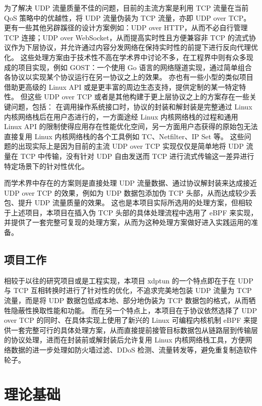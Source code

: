 为了解决 UDP 流量质量不佳的问题，目前的主流方案是利用 TCP 流量在当前 QoS 策略中的优越性，将 UDP 流量伪装为 TCP 流量，亦即 UDP over TCP。
更有一些其他另辟蹊径的设计方案例如：UDP over HTTP，从而不必自行管理 TCP 连接；UDP over WebSocket，从而提高实时性且方便兼容非 TCP 的流式协议作为下层协议，并允许通过内容分发网络在保持实时性的前提下进行反向代理优化。
这些处理方案由于技术性不高在学术界中讨论不多，在工程界中则有众多现成的项目实现，例如 GOST：一个使用 Go 语言的网络隧道实现，通过简单组合各协议以实现某个协议运行在另一协议之上的效果。
亦也有一些小型的类似项目借助更高级的 Linux API 或是更丰富的周边生态支持，提供定制的某一特定特性。
但这些 UDP over TCP 或者是其他构建于更上层协议之上的方案存在一些关键问题，包括：
在调用操作系统接口时，协议的封装和解封装是完整通过 Linux 内核网络栈后在用户态进行的，一方面途经 Linux 内核网络栈的过程和通用 Linux API 的限制使得应用存在性能优化空间，另一方面用户态获得的原始包无法直接复用 Linux 内核网络栈的各个工具例如 TC、Netfilter、IP Set 等。
这些问题的出现实际上是因为目前的主流 UDP over TCP 实现仅仅是简单地将 UDP 流量在 TCP 中传输，没有针对 UDP 自由发送而 TCP 进行流式传输这一差异进行特定场景下的针对性优化。

而学术界中存在的方案则是直接处理 UDP 流量数据、通过协议解封装来达成接近 UDP over TCP 的效果，例如为 UDP 数据包添加伪 TCP 头部\cite{9670120}，从而达成较少丢包、提升 UDP 流量质量的效果。
这也是本项目实际所选用的处理方案，但相较于上述项目，本项目在插入伪 TCP 头部的具体处理流程中选用了 eBPF 来实现，并提供了一套完整可复现的处理方案，从而为这种处理方案做好进入实践运用的准备。

\section{项目工作}

相较于以往的研究项目或是工程实现，本项目 xdptun 的一个特点即在于在 UDP 与 TCP 互相转换时进行了针对性的优化，不追求完美地包装 UDP 流量为 TCP 流量，而是将 UDP 数据包低成本地、部分地伪装为 TCP 数据包的格式，从而牺牲隐蔽性换取性能和功能。
而在另一个特点上，本项目在于协议依然选择了 UDP over TCP 的同时、在具体实现上使用了新兴的 Linux 可编程内核机制 eBPF 来提供一套完整可行的具体处理方案，从而直接提前接管目标数据包从链路层到传输层的协议处理，进而在封装前或解封装后允许复用 Linux 内核网络栈工具，方便网络数据的进一步处理如防火墙过滤、DDoS 检测、流量转发等，避免重复制造软件轮子。

\chapter{理论基础}

